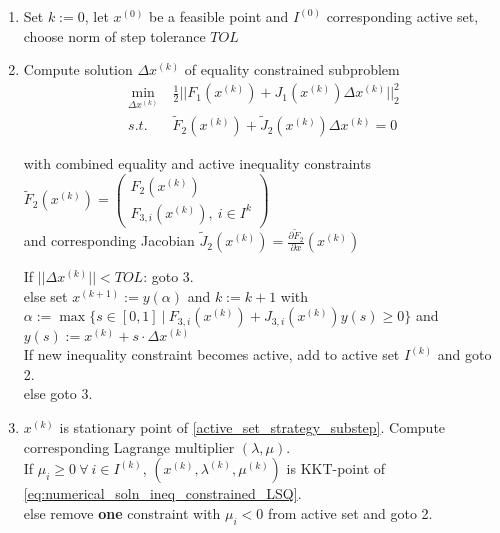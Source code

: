 \documentclass{scrartcl}[12pt, halfparskip]
\numberwithin{equation}{section}
\numberwithin{figure}{section}
\numberwithin{table}{section}
\begin{document}
\begin{enumerate}
	\item Set $k := 0$, let $x^{(0)}$ be a feasible point and $I^{(0)}$ corresponding active set, choose norm of step tolerance $TOL$
	\item Compute solution $\Delta x^{(k)}$ of equality constrained subproblem
	\begin{align}
	\min_{\Delta x^{(k)}} & \ \frac{1}{2} || F_1(x^{(k)}) + J_1(x^{(k)}) \Delta x^{(k)} ||_2^2 \label{active_set_strategy_substep} \\
	s.t. & \ \tilde{F}_2(x^{(k)}) + \tilde{J}_2(x^{(k)}) \Delta x^{(k)} = 0 \nonumber
	\end{align}
	
	with combined equality and active inequality constraints $\tilde{F}_2(x^{(k)}) = 
	\begin{pmatrix} 
	F_2(x^{(k)}) \\  
	F_{3,i}(x^{(k)}), \ i \in I^k
	\end{pmatrix}$ \\
	\textcolor{white}{\quad} and corresponding Jacobian $\tilde{J}_2(x^{(k)}) = \frac{\partial \tilde{F}_2}{\partial x}(x^{(k)})$
	
	If $||\Delta x^{(k)}|| < TOL$: goto 3. \\
	\textcolor{white}{\quad}else set $x^{(k+1)} := y(\alpha)$ and $k := k+1$ with \\
	\textcolor{white}{\qquad}$\alpha := \max\{ s \in [0,1] \ | \ F_{3,i}(x^{(k)}) + J_{3,i}(x^{(k)}) y(s) \ge 0 \}$ and \\
	\textcolor{white}{\qquad}$y(s) := x^{(k)} + s \cdot \Delta x^{(k)}$ \\
	
	If new inequality constraint becomes active, add to active set $I^{(k)}$ and goto 2. \\
	\textcolor{white}{\quad}else goto 3.
	
	\item $x^{(k)}$ is stationary point of \cref{active_set_strategy_substep}. Compute corresponding Lagrange multiplier $(\lambda, \mu)$. \\
	If $\mu_i \ge 0 \ \forall \ i \in I^{(k)}$, $(x^{(k)},\lambda^{(k)},\mu^{(k)})$ is KKT-point of \cref{eq:numerical_soln_ineq_constrained_LSQ}. \\
	\textcolor{white}{\quad}else remove \textbf{one} constraint with $\mu_i < 0$ from active set and goto 2.
	
\end{enumerate}
\end{document}
